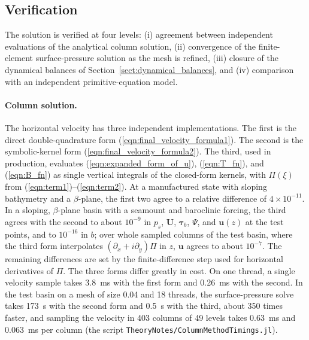 \documentclass{ametsocV6.2}
\begin{document}
\subsection{Verification}
\label{sect:verification}
The solution is verified at four levels: (i) agreement between independent evaluations of the analytical column solution, (ii) convergence of the finite-element surface-pressure solution as the mesh is refined, (iii) closure of the dynamical balances of Section~\ref{sect:dynamical_balances}, and (iv) comparison with an independent primitive-equation model.

\paragraph{Column solution.}
The horizontal velocity has three independent implementations.
The first is the direct double-quadrature form (\ref{eqn:final_velocity_formula1}).
The second is the symbolic-kernel form (\ref{eqn:final_velocity_formula2}).
The third, used in production, evaluates (\ref{eqn:expanded_form_of_u}), (\ref{eqn:T_fn}), and (\ref{eqn:B_fn}) as single vertical integrals of the closed-form kernels, with $\Pi(\xi)$ from (\ref{eqn:term1})--(\ref{eqn:term2}).
At a manufactured state with sloping bathymetry and a $\beta$-plane, the first two agree to a relative difference of $4 \times 10^{-11}$.
In a sloping, $\beta$-plane basin with a seamount and baroclinic forcing, the third agrees with the second to about $10^{-9}$ in $p_s$, $\mathbf{U}$, $\boldsymbol{\tau}_b$, $\Psi$, and $\mathbf{u}(z)$ at the test points, and to $10^{-16}$ in $b$; over whole sampled columns of the test basin, where the third form interpolates $(\partial_x + i \partial_y) \Pi$ in $z$, $\mathbf{u}$ agrees to about $10^{-7}$.
The remaining differences are set by the finite-difference step used for horizontal derivatives of $\Pi$.
The three forms differ greatly in cost.
On one thread, a single velocity sample takes 3.8~ms with the first form and 0.26~ms with the second.
In the test basin on a mesh of size 0.04 and 18 threads, the surface-pressure solve takes 173~s with the second form and 0.5~s with the third, about 350 times faster, and sampling the velocity in 403 columns of 49 levels takes 0.63~ms and 0.063~ms per column (the script \texttt{TheoryNotes/ColumnMethodTimings.jl}).
\end{document}
